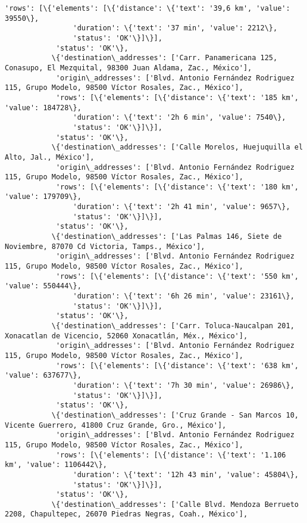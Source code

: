 \documentclass[11pt]{article}
\begin{document}
\begin{Verbatim}[commandchars=\\\{\}]
            'rows': [\{'elements': [\{'distance': \{'text': '39,6 km', 'value': 39550\},
                'duration': \{'text': '37 min', 'value': 2212\},
                'status': 'OK'\}]\}],
            'status': 'OK'\},
           \{'destination\_addresses': ['Carr. Panamericana 125, Conasupo, El Mezquital, 98300 Juan Aldama, Zac., México'],
            'origin\_addresses': ['Blvd. Antonio Fernández Rodriguez 115, Grupo Modelo, 98500 Víctor Rosales, Zac., México'],
            'rows': [\{'elements': [\{'distance': \{'text': '185 km', 'value': 184728\},
                'duration': \{'text': '2h 6 min', 'value': 7540\},
                'status': 'OK'\}]\}],
            'status': 'OK'\},
           \{'destination\_addresses': ['Calle Morelos, Huejuquilla el Alto, Jal., México'],
            'origin\_addresses': ['Blvd. Antonio Fernández Rodriguez 115, Grupo Modelo, 98500 Víctor Rosales, Zac., México'],
            'rows': [\{'elements': [\{'distance': \{'text': '180 km', 'value': 179709\},
                'duration': \{'text': '2h 41 min', 'value': 9657\},
                'status': 'OK'\}]\}],
            'status': 'OK'\},
           \{'destination\_addresses': ['Las Palmas 146, Siete de Noviembre, 87070 Cd Victoria, Tamps., México'],
            'origin\_addresses': ['Blvd. Antonio Fernández Rodriguez 115, Grupo Modelo, 98500 Víctor Rosales, Zac., México'],
            'rows': [\{'elements': [\{'distance': \{'text': '550 km', 'value': 550444\},
                'duration': \{'text': '6h 26 min', 'value': 23161\},
                'status': 'OK'\}]\}],
            'status': 'OK'\},
           \{'destination\_addresses': ['Carr. Toluca-Naucalpan 201, Xonacatlan de Vicencio, 52060 Xonacatlán, Méx., México'],
            'origin\_addresses': ['Blvd. Antonio Fernández Rodriguez 115, Grupo Modelo, 98500 Víctor Rosales, Zac., México'],
            'rows': [\{'elements': [\{'distance': \{'text': '638 km', 'value': 637677\},
                'duration': \{'text': '7h 30 min', 'value': 26986\},
                'status': 'OK'\}]\}],
            'status': 'OK'\},
           \{'destination\_addresses': ['Cruz Grande - San Marcos 10, Vicente Guerrero, 41800 Cruz Grande, Gro., México'],
            'origin\_addresses': ['Blvd. Antonio Fernández Rodriguez 115, Grupo Modelo, 98500 Víctor Rosales, Zac., México'],
            'rows': [\{'elements': [\{'distance': \{'text': '1.106 km', 'value': 1106442\},
                'duration': \{'text': '12h 43 min', 'value': 45804\},
                'status': 'OK'\}]\}],
            'status': 'OK'\},
           \{'destination\_addresses': ['Calle Blvd. Mendoza Berrueto 2208, Chapultepec, 26070 Piedras Negras, Coah., México'],

\end{Verbatim}
\end{document}
